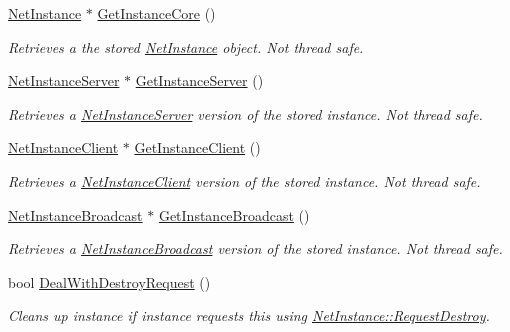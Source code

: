 \begin{DoxyCompactItemize}
\hyperlink{class_net_instance}{NetInstance} $\ast$ \hyperlink{class_net_instance_container_aaa357af0fc69273afc0bc8acf3435196}{GetInstanceCore} ()
\begin{DoxyCompactList}\small\item\em Retrieves a the stored \hyperlink{class_net_instance}{NetInstance} object. Not thread safe. \item\end{DoxyCompactList}\item 
\hyperlink{class_net_instance_server}{NetInstanceServer} $\ast$ \hyperlink{class_net_instance_container_a6516b8eab4330744f3c486a9fb13dceb}{GetInstanceServer} ()
\begin{DoxyCompactList}\small\item\em Retrieves a \hyperlink{class_net_instance_server}{NetInstanceServer} version of the stored instance. Not thread safe. \item\end{DoxyCompactList}\item 
\hyperlink{class_net_instance_client}{NetInstanceClient} $\ast$ \hyperlink{class_net_instance_container_a9f12e1f36f4cac22aa953138d12ef8a3}{GetInstanceClient} ()
\begin{DoxyCompactList}\small\item\em Retrieves a \hyperlink{class_net_instance_client}{NetInstanceClient} version of the stored instance. Not thread safe. \item\end{DoxyCompactList}\item 
\hyperlink{class_net_instance_broadcast}{NetInstanceBroadcast} $\ast$ \hyperlink{class_net_instance_container_acd72db86d4c16964739ae00014b23251}{GetInstanceBroadcast} ()
\begin{DoxyCompactList}\small\item\em Retrieves a \hyperlink{class_net_instance_broadcast}{NetInstanceBroadcast} version of the stored instance. Not thread safe. \item\end{DoxyCompactList}\item 
bool \hyperlink{class_net_instance_container_a1be5404d0083670cd3e8d2877df842c8}{DealWithDestroyRequest} ()
\begin{DoxyCompactList}\small\item\em Cleans up instance if instance requests this using \hyperlink{class_net_instance_a68147db634644849af174937e6706ded}{NetInstance::RequestDestroy}. \item\end{DoxyCompactList}\end{DoxyCompactItemize}
